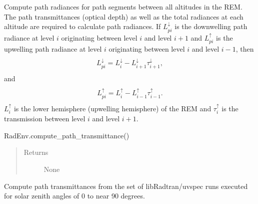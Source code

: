 \documentclass[a4paper,10pt,english]{sphinxmanual}
\begin{document}
\begin{fulllineitems}
\begin{fulllineitems}
\label{packages:librad.RadEnv.compute_path_radiance}
Compute path radiances for path segments between all altitudes in the REM.
The path transmittances (optical depth) as well as the total radiances at each altitude are required to
calculate path radiances. If \(L_{pi}^{\downarrow}\) is the downwelling path radiance at level \(i\)
originating between level \(i\) and level \(i+1\) and \(L_{pi}^{\uparrow}\) is the upwelling
path radiance at level \(i\) originating between level \(i\) and level \(i-1\), then
\begin{align*}\begin{aligned}
\begin{split}L_{pi}^{\downarrow}=L_{i}^{\downarrow}-L_{i+1}^{\downarrow}\tau_{i+1}^{\downarrow},\end{split}\end{aligned}\end{align*}
and
\begin{align*}\begin{aligned}
\begin{split}L_{pi}^{\uparrow}=L_{i}^{\uparrow}-L_{i-1}^{\uparrow}\tau_{i-1}^{\uparrow}.\end{split}\end{aligned}\end{align*}
\(L_{i}^{\uparrow}\) is the lower hemisphere (upwelling hemisphere) of the REM and
\(\tau_{i}^{\uparrow}\) is the transmission between level \(i\) and level \(i+1\).




RadEnv.compute\_path\_transmittance()


\begin{quote}\begin{description}
\item[{Returns}] \leavevmode
None

\end{description}\end{quote}

\end{fulllineitems}


\begin{fulllineitems}
\label{packages:librad.RadEnv.compute_path_transmittance}
Compute path transmittances from the set of libRadtran/uvspec runs executed for solar zenith angles
of 0 to near 90 degrees.


\end{fulllineitems}
\end{fulllineitems}
\end{document}
